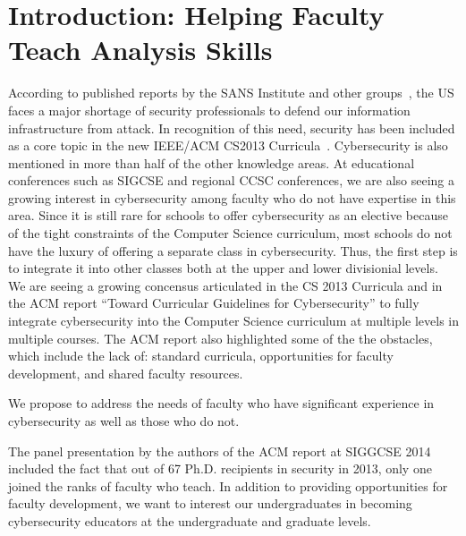 

%


\section{Introduction: Helping Faculty Teach Analysis Skills}
\label{sec:intro}

According to published reports by the SANS Institute and other 
groups~\cite{defensenewsshortage}, the US faces a major shortage of 
security professionals to defend our information infrastructure from
attack.  In recognition of this need, security has been included as
a core topic in the new 
IEEE/ACM CS2013 Curricula~\cite{acmcurriculum}.   Cybersecurity is also mentioned
in more than half of the other knowledge areas.  At educational conferences such
as SIGCSE and regional CCSC conferences, we are also seeing a growing interest 
in cybersecurity among faculty who do not have expertise in this area.
Since it is still rare for schools to offer cybersecurity as an elective
because of the tight 
constraints of the Computer Science curriculum, most schools 
do not have the luxury of offering a separate class in cybersecurity.
  Thus, 
the first step is to integrate it into other classes both at the upper and lower divisionial
levels.  We are seeing a growing concensus articulated in the CS 2013 Curricula and
in the  ACM report ``Toward Curricular Guidelines for Cybersecurity''
to fully integrate cybersecurity into the Computer Science curriculum at multiple levels
in multiple courses.
The ACM report also highlighted some of the the obstacles, which include the lack of:
standard curricula,
opportunities for faculty development,  
and shared faculty resources.

We propose to address the needs of  faculty who have
significant experience in cybersecurity as well as those who do not.

The panel presentation by the authors of the ACM report at SIGGCSE 2014 included the
fact that out of 67 Ph.D. recipients in security in 2013, only one joined the ranks of 
faculty who teach.
In addition to providing opportunities for faculty development, we want to 
interest our undergraduates in becoming cybersecurity educators at the undergraduate and
graduate levels.

